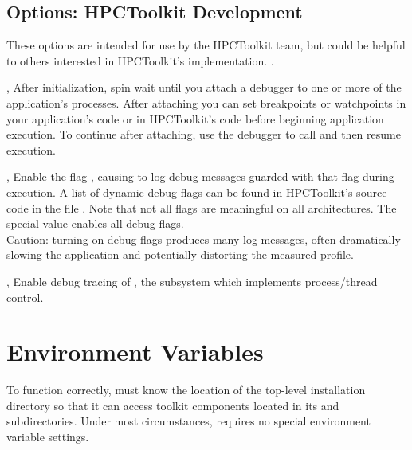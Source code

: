 \documentclass[english]{article}
\begin{document}
\subsection{Options: HPCToolkit Development}

\begin{Description}

These options are intended for use by the HPCToolkit team,
but could be helpful to others interested in HPCToolkit's implementation.
.
 
\item[\Opt{-d}, \Opt{--debug}]
After initialization, spin wait until you attach a debugger
to one or more of the application's processes.
After attaching you can set breakpoints or watchpoints in your application's code
or in HPCToolkit's  code before beginning application execution.
To continue after attaching, use the debugger to call 
and then resume execution.

\item[\OptArg{-dd}{flag}, \OptArg{--dynamic-debug}{flag}]
Enable the flag ,
causing  to log debug messages guarded with that flag
during execution.
A list of dynamic debug flags can be found in HPCToolkit's source code
in the file .
Note that not all flags are meaningful on all architectures.
The special value  enables all debug flags.
\\
Caution: turning on debug flags produces many log messages,
often dramatically slowing the application and potentially distorting the measured profile.

\item[\Opt{-md}, \Opt{--monitor-debug}]
Enable debug tracing of , the  subsystem which implements process/thread control.

\end{Description}



\section{Environment Variables}
To function correctly,  must know the location of the  
top-level installation directory so that it can access toolkit components located 
in its  and  subdirectories. 
Under most circumstances,  requires no special environment variable settings.
\end{document}
